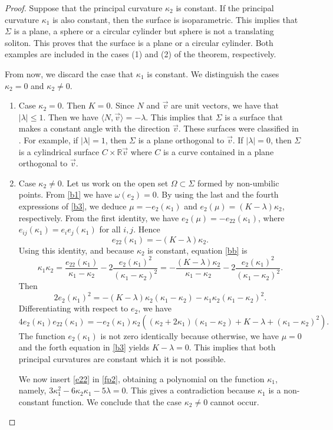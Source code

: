 \documentclass[a4paper,12pt]{amsart}
\theoremstyle{definition}
\def\r{\mathbb R}
\begin{document}
\begin{proof} Suppose that the principal curvature $\kappa_2$ is constant. If the   principal curvature $\kappa_1$ is also constant, then the surface is isoparametric. This implies  that $\Sigma$ is a plane, a sphere or a circular cylinder but sphere is not a translating soliton. This proves that the surface is a plane or a circular cylinder. Both examples are included in the cases (1) and (2) of the theorem, respectively. 

From now, we discard the case that $\kappa_1$ is constant. We distinguish  the cases $\kappa_2=0$ and $\kappa_2\not=0$. 
\begin{enumerate}
\item Case $\kappa_2=0$. Then $K=0$. Since $N$ and $\vec{v}$ are unit vectors, we have that $|\lambda|\leq 1$. Then we have $\langle N,\vec{v}\rangle=-\lambda$. This implies that $\Sigma$ is a surface that makes a constant angle with the direction $\vec{v}$. These surfaces were classified in \cite{mn}. For example, if $|\lambda|=1$, then $\Sigma$ is a plane orthogonal to $\vec{v}$. If $|\lambda|=0$, then $\Sigma$ is a cylindrical surface $C\times \r\vec{v}$ where $C$ is a curve contained in a plane orthogonal to $\vec{v}$. 

\item Case $\kappa_2\not=0$.    Let us work on the  open set $\Omega\subset \Sigma$ formed by non-umbilic points. From \eqref{b1} we have $\omega(e_2)=0$. By using  the last and the fourth expressions of \eqref{b3}, we deduce   $\mu=-e_2(\kappa_1)$ and $e_2(\mu)=(K-\lambda)\kappa_2$, respectively. From the first identity, we have  
$e_2(\mu)=-e_{22}(\kappa_1)$, where  $e_{ij}(\kappa_1)=e_ie_j(\kappa_1)$ for all $i,j$. Hence 
\begin{equation}\label{e22}
e_{22}(\kappa_1)=-(K-\lambda)\kappa_2.
\end{equation}
Using this identity, and because $\kappa_2$ is constant, equation \eqref{bb} is 
$$\kappa_1\kappa_2=\frac{e_{22}(\kappa_1)}{\kappa_1-\kappa_2}-2\frac{e_2(\kappa_1)^2}{(\kappa_1-\kappa_2)^2}=
-\frac{(K-\lambda)\kappa_2}{\kappa_1-\kappa_2}-2\frac{e_2(\kappa_1)^2}{(\kappa_1-\kappa_2)^2}.$$
 Then 
 $$2e_2(\kappa_1)^2=-(K-\lambda) \kappa_2(\kappa_1-\kappa_2) -\kappa_1\kappa_2 (\kappa_1-\kappa_2)^2.$$
 Differentiating with respect to $e_2$, we have 
\begin{equation}\label{fp2}
4e_2(\kappa_1)e_{22}(\kappa_1)=-e_2(\kappa_1)\kappa_2\left( (\kappa_2+2\kappa_1)(\kappa_1-\kappa_2)+ K-\lambda + (\kappa_1-\kappa_2)^2\right).
\end{equation}
 The function  $e_2(\kappa_1)$ is not zero identically because otherwise, we have $\mu=0$ and the forth equation in \eqref{b3} yields $K-\lambda=0$. This implies that both principal curvatures are constant which it is not possible. 
  
 We now insert  \eqref{e22} in \eqref{fp2}, obtaining a polynomial on the function $\kappa_1$, namely, 
 $3\kappa_1^2-6\kappa_2\kappa_1-5\lambda=0$. This gives a contradiction because $\kappa_1$ is a non-constant function. We conclude that the case $\kappa_2\not=0$ cannot occur.
 \end{enumerate}
  \end{proof}
  
\end{document}
